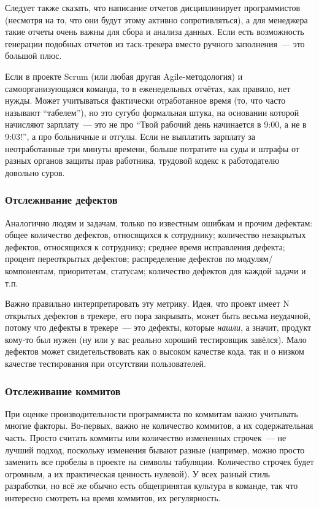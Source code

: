 \documentclass{../../text-style}
\begin{document}
Следует также сказать, что написание отчетов дисциплинирует программистов (несмотря на то, что они будут этому активно сопротивляться), а для менеджера такие отчеты очень важны для сбора и анализа данных. Если есть возможность генерации подобных отчетов из таск-трекера вместо ручного заполнения~--- это большой плюс.

Если в проекте Scrum (или любая другая Agile-методология) и самоорганизующаяся команда, то в еженедельных отчётах, как правило, нет нужды. Может учитываться фактически отработанное время (то, что часто называют \enquote{табелем}), но это сугубо формальная штука, на основании которой начисляют зарплату~--- это не про \enquote{Твой рабочий день начинается в 9:00, а не в 9:03!}, а про больничные и отгулы. Если не выплатить зарплату за неотработанные три минуты времени, больше потратите на суды и штрафы от разных органов защиты прав работника, трудовой кодекс к работодателю довольно суров.

\subsubsection{Отслеживание дефектов}

Аналогично людям и задачам, только по известным ошибкам и прочим дефектам: общее количество дефектов, относящихся к сотруднику; количество незакрытых дефектов, относящихся к сотруднику; среднее время исправления дефекта; процент переоткрытых дефектов; распределение дефектов по модулям/компонентам, приоритетам, статусам; количество дефектов для каждой задачи и т.п.

Важно правильно интерпретировать эту метрику. Идея, что проект имеет N открытых дефектов в трекере, его пора закрывать, может быть весьма неудачной, потому что дефекты в трекере~--- это дефекты, которые \emph{нашли}, а значит, продукт кому-то был нужен (ну или у вас реально хороший тестировщик завёлся). Мало дефектов может свидетельствовать как о высоком качестве кода, так и о низком качестве тестирования при отсутствии пользователей.

\subsubsection{Отслеживание коммитов}

При оценке производительности программиста по коммитам важно учитывать многие факторы. Во-первых, важно не количество коммитов, а их содержательная часть. Просто считать коммиты или количество измененных строчек~--- не лучший подход, поскольку изменения бывают разные (например, можно просто заменить все пробелы в проекте на символы табуляции. Количество строчек будет огромным, а их практическая ценность нулевой). У всех разный стиль разработки, но всё же обычно есть общепринятая культура в команде, так что интересно смотреть на время коммитов, их регулярность.
\end{document}
